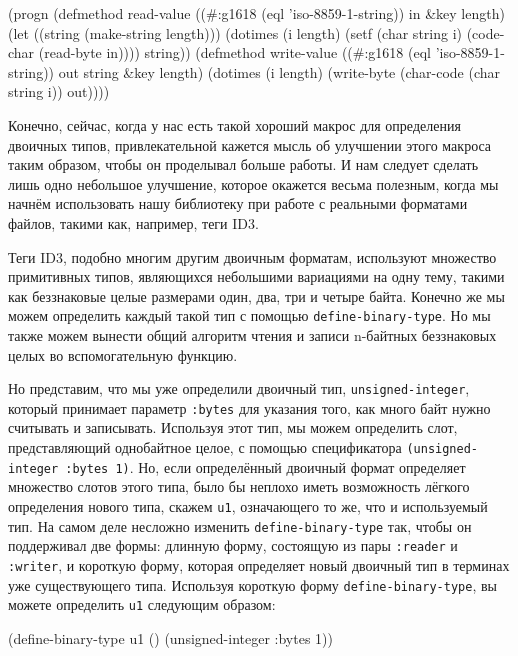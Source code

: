 \begin{myverb}
(progn
  (defmethod read-value ((#:g1618 (eql 'iso-8859-1-string)) in &key length)
    (let ((string (make-string length)))
      (dotimes (i length)
        (setf (char string i) (code-char (read-byte in))))
      string))
  (defmethod write-value ((#:g1618 (eql 'iso-8859-1-string)) out string &key length)
    (dotimes (i length)
      (write-byte (char-code (char string i)) out))))
\end{myverb}

Конечно, сейчас, когда у нас есть такой хороший макрос для определения двоичных типов,
привлекательной кажется мысль об улучшении этого макроса таким образом, чтобы он
проделывал больше работы. И нам следует сделать лишь одно небольшое улучшение,
которое окажется весьма полезным, когда мы начнём использовать нашу библиотеку при работе
с реальными форматами файлов, такими как, например, теги ID3.

Теги ID3, подобно многим другим двоичным форматам, используют множество примитивных типов,
являющихся небольшими вариациями на одну тему, такими как беззнаковые целые размерами
один, два, три и четыре байта. Конечно же мы можем определить каждый такой тип с помощью
\lstinline{define-binary-type}. Но мы также можем вынести общий алгоритм чтения и записи
n-байтных беззнаковых целых во вспомогательную функцию.

Но представим, что мы уже определили двоичный тип, \lstinline{unsigned-integer}, который
принимает параметр \lstinline{:bytes} для указания того, как много байт нужно считывать и
записывать. Используя этот тип, мы можем определить слот, представляющий однобайтное целое,
с помощью спецификатора \lstinline{(unsigned-integer :bytes 1)}. Но, если определённый двоичный
формат определяет множество слотов этого типа, было бы неплохо иметь возможность лёгкого
определения нового типа, скажем \lstinline{u1}, означающего то же, что и используемый тип. На
самом деле несложно изменить \lstinline{define-binary-type} так, чтобы он поддерживал две
формы: длинную форму, состоящую из пары \lstinline{:reader} и \lstinline{:writer}, и короткую форму,
которая определяет новый двоичный тип в терминах уже су\-щест\-вую\-щего типа. Используя
короткую форму \lstinline{define-binary-type}, вы можете определить \lstinline{u1} следующим образом:

\begin{myverb}
(define-binary-type u1 () (unsigned-integer :bytes 1))
\end{myverb}

